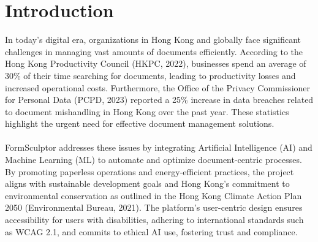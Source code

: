 \section{Introduction}

In today's digital era, organizations in Hong Kong and globally face significant challenges in managing vast amounts of documents efficiently. According to the Hong Kong Productivity Council (HKPC, 2022), businesses spend an average of 30\% of their time searching for documents, leading to productivity losses and increased operational costs. Furthermore, the Office of the Privacy Commissioner for Personal Data (PCPD, 2023) reported a 25\% increase in data breaches related to document mishandling in Hong Kong over the past year. These statistics highlight the urgent need for effective document management solutions.
\\
\noindent
\\
FormSculptor addresses these issues by integrating Artificial Intelligence (AI) and Machine Learning (ML) to automate and optimize document-centric processes. By promoting paperless operations and energy-efficient practices, the project aligns with sustainable development goals and Hong Kong's commitment to environmental conservation as outlined in the Hong Kong Climate Action Plan 2050 (Environmental Bureau, 2021). The platform's user-centric design ensures accessibility for users with disabilities, adhering to international standards such as WCAG 2.1, and commits to ethical AI use, fostering trust and compliance.